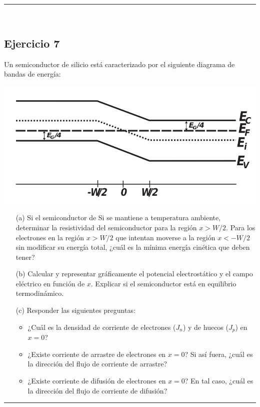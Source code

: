 \rule{\textwidth}{0.1pt} \\[2pt]

\subsection{Ejercicio 7}

Un semiconductor de silicio está caracterizado por el siguiente diagrama de bandas de energía:
\begin{center}
	\includegraphics[width=0.7\linewidth]{Cuerpo/Ch_02/02_Ejercicio_15.png}		
\end{center}

\begin{itemize}
	\item[(a)] Si el semiconductor de Si se mantiene a temperatura ambiente, determinar la resistividad del semiconductor para la región \(x > W/2\). Para los electrones en la región \(x > W/2\) que intentan moverse a la región \(x < -W/2\) sin modificar su energía total, ¿cuál es la mínima energía cinética que deben tener?
	\item[(b)] Calcular y representar gráficamente el potencial electrostático y el campo eléctrico en función de \(x\). Explicar si el semiconductor está en equilibrio termodinámico.
	\item[(c)] Responder las siguientes preguntas:
		  \begin{itemize}
			  \item ¿Cuál es la densidad de corriente de electrones (\(J_n\)) y de huecos (\(J_p\)) en \(x = 0\)?
			  \item ¿Existe corriente de arrastre de electrones en \(x = 0\)? Si así fuera, ¿cuál es la dirección del flujo de corriente de arrastre?
			  \item ¿Existe corriente de difusión de electrones en \(x = 0\)? En tal caso, ¿cuál es la dirección del flujo de corriente de difusión?
			\end{itemize}
  \end{itemize}

\rule{\textwidth}{0.1pt} \\[2pt]

